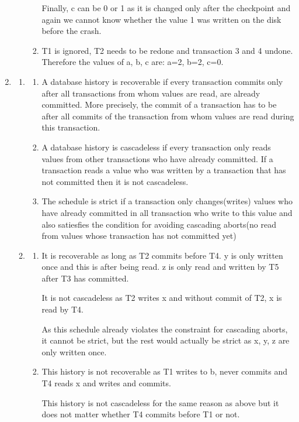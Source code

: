 \documentclass[12pt]{extarticle}
\begin{document}
\begin{flushleft}
\begin{enumerate}[label=\textbf{\Alph*.}]
\begin{enumerate}[label=\arabic*.]
\begin{enumerate}[label=(\alph*)]
Finally, c can be 0 or 1 as it is changed only after the checkpoint and again we cannot know whether the value 1 was written on the disk before the crash. 
\item T1 is ignored, T2 needs to be redone and transaction 3 and 4 undone. Therefore the values of a, b, c are: a=2, b=2, c=0. 
\end{enumerate}
\end{enumerate}
\item 
\begin{enumerate}[label=\arabic*.]
\item \begin{enumerate}[label=(\alph*)]
\item A database history is recoverable if every transaction commits only after all transactions from whom values are read, are already committed. More precisely, the commit of a transaction has to be after all commits of the transaction from whom values are read during this transaction. 
\item A database history is cascadeless if every transaction only reads values from other transactions who have already committed. If a transaction reads a value who was written by a transaction that has not committed then it is not cascadeless.
\item The schedule is strict if a transaction only changes(writes) values who have already committed in all transaction who write to this value and also satiesfies the condition for avoiding cascading aborts(no read from values whose transaction has not committed yet)
\end{enumerate}
\item \begin{enumerate}[label=(\alph*)]
\item It is recoverable as long as T2 commits before T4. y is only written once and this is after being read. z is only read and written by T5 after T3 has committed. 

It is not cascadeless as T2 writes x and without commit of T2, x is read by T4. 

As this schedule already violates the constraint for cascading aborts, it cannot be strict, but the rest would actually be strict as x, y, z are only written once.
\item This history is not recoverable as T1 writes to b, never commits and T4 reads x and writes and commits. 

This history is not cascadeless for the same reason as above but it does not matter whether T4 commits before T1 or not. 


\end{enumerate}
\end{enumerate}
\end{enumerate}
\end{flushleft}
\end{document}
